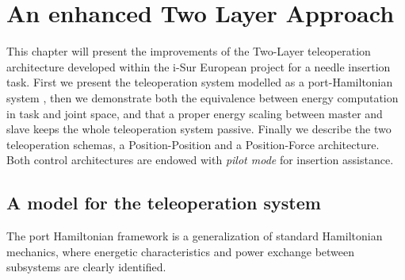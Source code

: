 \chapter{An enhanced Two Layer Approach}

This chapter will present the improvements of the Two-Layer teleoperation architecture developed within the i-Sur European project \cite{Ferraguti2015} for a needle insertion task.
First we present the teleoperation system modelled as a port-Hamiltonian system \cite{Ferraguti2015}, then we demonstrate both the equivalence between energy computation in task and joint space, and that a proper energy scaling between master and slave keeps the whole teleoperation system passive.
Finally we describe the two teleoperation schemas, a Position-Position and a Position-Force architecture. Both control architectures are endowed with \textit{pilot mode} for insertion assistance.

\section{A model for the teleoperation system}
The port Hamiltonian framework is a generalization of standard Hamiltonian mechanics, where energetic characteristics and power exchange between subsystems are clearly identified.
